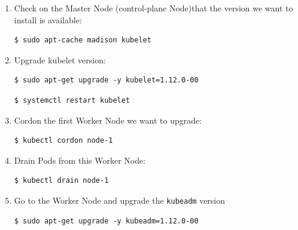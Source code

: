 \documentclass{article}
\newenvironment{codetemplate}[1][]{%
  \mybasecolorbox[#1]
  \itshape
}{%
  \endmybasecolorbox
}
\begin{document}
\begin{enumerate}
    \item Check on the Master Node (control-plane Node)that the version we want to install is available:
\begin{codetemplate}{}
\begin{verbatim}
$ sudo apt-cache madison kubelet
\end{verbatim}
\end{codetemplate}

    \item Upgrade kubelet version:
\begin{codetemplate}{}
\begin{verbatim}
$ sudo apt-get upgrade -y kubelet=1.12.0-00
\end{verbatim}
\end{codetemplate}
\begin{codetemplate}{}
\begin{verbatim}
$ systemctl restart kubelet
\end{verbatim}
\end{codetemplate}

    \item Cordon the first Worker Node we want to upgrade:
\begin{codetemplate}{}
\begin{verbatim}
$ kubectl cordon node-1
\end{verbatim}
\end{codetemplate}

    \item Drain Pods from this Worker Node:
\begin{codetemplate}{}
\begin{verbatim}
$ kubectl drain node-1
\end{verbatim}
\end{codetemplate}

    \item Go to the Worker Node and upgrade the \verb|kubeadm| version
\begin{codetemplate}{}
\begin{verbatim}
$ sudo apt-get upgrade -y kubeadm=1.12.0-00
\end{verbatim}
\end{codetemplate}


\end{enumerate}
\end{document}
